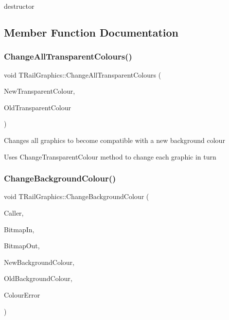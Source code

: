 destructor 

\subsection{Member Function Documentation}
\mbox{\label{class_t_rail_graphics_a5121c6d8b8fa69eefc293ca51cddce88}} 
\subsubsection{\texorpdfstring{Change\+All\+Transparent\+Colours()}{ChangeAllTransparentColours()}}
{\footnotesize\ttfamily void T\+Rail\+Graphics\+::\+Change\+All\+Transparent\+Colours (\begin{DoxyParamCaption}\item[{T\+Color}]{New\+Transparent\+Colour,  }\item[{T\+Color}]{Old\+Transparent\+Colour }\end{DoxyParamCaption})}

Changes all graphics to become compatible with a new background colour

Uses \textquotesingle{}Change\+Transparent\+Colour\textquotesingle{} method to change each graphic in turn \mbox{\label{class_t_rail_graphics_a74d7dcd5e17ef156d8c216c8e524de11}} 
\subsubsection{\texorpdfstring{Change\+Background\+Colour()}{ChangeBackgroundColour()}}
{\footnotesize\ttfamily void T\+Rail\+Graphics\+::\+Change\+Background\+Colour (\begin{DoxyParamCaption}\item[{int}]{Caller,  }\item[{Graphics\+::\+T\+Bitmap $\ast$}]{Bitmap\+In,  }\item[{Graphics\+::\+T\+Bitmap $\ast$}]{Bitmap\+Out,  }\item[{T\+Color}]{New\+Background\+Colour,  }\item[{T\+Color}]{Old\+Background\+Colour,  }\item[{bool \&}]{Colour\+Error }\end{DoxyParamCaption})}

